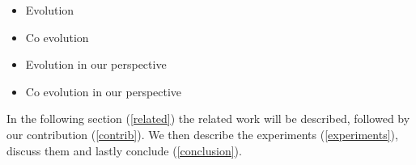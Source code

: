 
\begin{itemize}
  \item{Evolution}
  \item{Co evolution}
  \item{Evolution in our perspective}
  \item{Co evolution in our perspective}
\end{itemize}

In the following section (\ref{related}) the related work will be described, followed by our contribution (\ref{contrib}). We then describe the experiments (\ref{experiments}), discuss them and lastly conclude (\ref{conclusion}).

